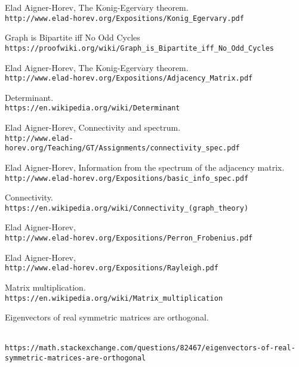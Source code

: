 \documentclass[a4paper, 11pt, oneside]{article}
\begin{document}
\begin{thebibliography}{9} 
Elad Aigner-Horev,
The K$\ddot{o}$nig-Egerv$\acute{a}$ry theorem.
\\\texttt{http://www.elad-horev.org/Expositions/Konig\_Egervary.pdf}

Graph is Bipartite iff No Odd Cycles
\\\texttt{https://proofwiki.org/wiki/Graph\_is\_Bipartite\_iff\_No\_Odd\_Cycles}

Elad Aigner-Horev,
The K$\ddot{o}$nig-Egerv$\acute{a}$ry theorem.
\\\texttt{http://www.elad-horev.org/Expositions/Adjacency\_Matrix.pdf}

Determinant.
\\\texttt{https://en.wikipedia.org/wiki/Determinant}

Elad Aigner-Horev,
Connectivity and spectrum.
\\\texttt{http://www.elad-horev.org/Teaching/GT/Assignments/connectivity\_spec.pdf}

Elad Aigner-Horev,
Information from the spectrum of the adjacency matrix.
\\\texttt{http://www.elad-horev.org/Expositions/basic\_info\_spec.pdf}

Connectivity.
\\\texttt{https://en.wikipedia.org/wiki/Connectivity\_(graph\_theory)}

Elad Aigner-Horev,
\\\texttt{http://www.elad-horev.org/Expositions/Perron\_Frobenius.pdf}

Elad Aigner-Horev,
\\\texttt{http://www.elad-horev.org/Expositions/Rayleigh.pdf}

Matrix multiplication.
\\\texttt{https://en.wikipedia.org/wiki/Matrix\_multiplication}

Eigenvectors of real symmetric matrices are orthogonal.
\begin{scriptsize}
\\\texttt{https://math.stackexchange.com/questions/82467/eigenvectors-of-real-symmetric-matrices-are-orthogonal}
\end{scriptsize}
\end{thebibliography}
\end{document}
